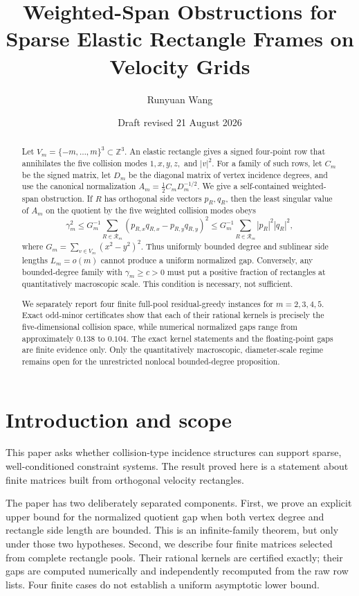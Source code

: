 \documentclass[11pt]{article}
\title{Weighted-Span Obstructions for Sparse Elastic Rectangle Frames on Velocity Grids}
\author{Runyuan Wang}
\date{Draft revised 21 August 2026}
\theoremstyle{definition}
\theoremstyle{remark}
\begin{document}
\maketitle

\begin{abstract}
Let $V_m=\{-m,\ldots,m\}^3\subset\mathbb Z^3$.  An elastic
rectangle gives a signed four-point row that annihilates the five collision
modes $1,x,y,z,$ and $|v|^2$.  For a family of such rows, let
$C_m$ be the signed matrix, let $D_m$ be the diagonal matrix of vertex
incidence degrees, and use the canonical normalization
$A_m=\tfrac12 C_mD_m^{-1/2}$.  We give a self-contained weighted-span
obstruction.  If $R$ has orthogonal side vectors $p_R,q_R$, then the least
singular value of $A_m$ on the quotient by the five weighted collision modes
obeys
\[
 \gamma_m^2\leq
 G_m^{-1}\sum_{R\in\mathcal R_m}(p_{R,x}q_{R,x}-p_{R,y}q_{R,y})^2
 \leq G_m^{-1}\sum_{R\in\mathcal R_m}|p_R|^2|q_R|^2,
\]
where $G_m=\sum_{v\in V_m}(x^2-y^2)^2$.  Thus uniformly bounded degree
and sublinear side lengths $L_m=o(m)$ cannot produce a uniform normalized
gap.  Conversely, any bounded-degree family with $\gamma_m\geq c>0$ must put
a positive fraction of rectangles at quantitatively macroscopic scale.  This
condition is necessary, not sufficient.

We separately report four finite full-pool residual-greedy instances for
$m=2,3,4,5$.  Exact odd-minor certificates show that each of their rational
kernels is precisely the five-dimensional collision space, while numerical
normalized gaps range from approximately $0.138$ to $0.104$.  The exact
kernel statements and the floating-point gaps are finite evidence only.
Only the quantitatively macroscopic, diameter-scale regime remains open for
the unrestricted nonlocal bounded-degree proposition.
\end{abstract}

\section{Introduction and scope}\label{sec:intro}

This paper asks whether collision-type incidence structures can support
sparse, well-conditioned constraint systems.  The result proved here is a
statement about finite matrices built from orthogonal velocity rectangles.

The paper has two deliberately separated components.  First, we prove an
explicit upper bound for the normalized quotient gap when both vertex degree
and rectangle side length are bounded.  This is an infinite-family theorem,
but only under those two hypotheses.  Second, we describe four finite
matrices selected from complete rectangle pools.  Their rational kernels are
certified exactly; their gaps are computed numerically and independently
recomputed from the raw row lists.  Four finite cases do not establish a
uniform asymptotic lower bound.
\end{document}
